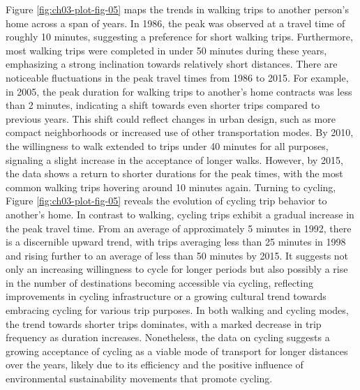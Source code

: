 \documentclass[
11pt, %
oneside, %
english, %
singlespacing, %
]{macthesis} %
\begin{document}
Figure \ref{fig:ch03-plot-fig-05} maps the trends in walking trips to another person's home across a span of years. In 1986, the peak was observed at a travel time of roughly 10 minutes, suggesting a preference for short walking trips. Furthermore, most walking trips were completed in under 50 minutes during these years, emphasizing a strong inclination towards relatively short distances.
There are noticeable fluctuations in the peak travel times from 1986 to 2015. For example, in 2005, the peak duration for walking trips to another's home contracts was less than 2 minutes, indicating a shift towards even shorter trips compared to previous years. This shift could reflect changes in urban design, such as more compact neighborhoods or increased use of other transportation modes. By 2010, the willingness to walk extended to trips under 40 minutes for all purposes, signaling a slight increase in the acceptance of longer walks. However, by 2015, the data shows a return to shorter durations for the peak times, with the most common walking trips hovering around 10 minutes again. Turning to cycling, Figure \ref{fig:ch03-plot-fig-05} reveals the evolution of cycling trip behavior to another's home. In contrast to walking, cycling trips exhibit a gradual increase in the peak travel time. From an average of approximately 5 minutes in 1992, there is a discernible upward trend, with trips averaging less than 25 minutes in 1998 and rising further to an average of less than 50 minutes by 2015. It suggests not only an increasing willingness to cycle for longer periods but also possibly a rise in the number of destinations becoming accessible via cycling, reflecting improvements in cycling infrastructure or a growing cultural trend towards embracing cycling for various trip purposes. In both walking and cycling modes, the trend towards shorter trips dominates, with a marked decrease in trip frequency as duration increases. Nonetheless, the data on cycling suggests a growing acceptance of cycling as a viable mode of transport for longer distances over the years, likely due to its efficiency and the positive influence of environmental sustainability movements that promote cycling.
\end{document}
